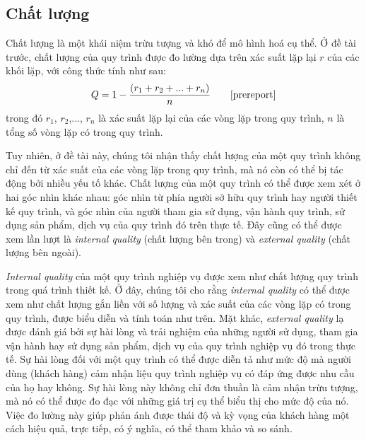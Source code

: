 \subsection{Chất lượng}
Chất lượng là một khái niệm trừu tượng và khó để mô hình hoá cụ thể. Ở đề tài
trước, chất lượng của quy trình được đo lường dựa trên xác suất lặp lại $r$ của
các khối lặp, với công thức tính như sau:
\[ Q = 1 - \frac{(r_1 + r_2 + ... + r_n)}{n} \tag*{\cite{prereport}}\]
trong đó $r_1$, $r_2$,..., $r_n$ là xác suất lặp lại của các vòng lặp trong quy
trình, $n$ là tổng số vòng lặp có trong quy trình.
\par
Tuy nhiên, ở đề tài này, chúng tôi nhận thấy chất lượng của một quy trình không
chỉ đến từ xác suất của các vòng lặp trong quy trình, mà nó còn có thể bị tác
động bởi nhiều yếu tố khác. Chất lượng của một quy trình có thể được xem xét ở
hai góc nhìn khác nhau: góc nhìn từ phía người sở hữu quy trình hay người thiết
kế quy trình, và góc nhìn của người tham gia sử dụng, vận hành quy trình, sử
dụng sản phẩm, dịch vụ của quy trình đó trên thực tế. Đây cũng có thể được xem
lần lượt là \emph{internal quality} (chất lượng bên trong) và \emph{external
    quality} (chất lượng bên ngoài).
\par
\emph{Internal quality} của một quy trình nghiệp vụ được xem như chất lượng quy trình trong quá trình thiết kế. Ở đây, chúng tôi cho rằng \emph{internal quality} có thể được xem như chất lượng gắn liền với số lượng và xác suất của các vòng lặp có trong quy trình, được biểu diễn và tính toán như trên. Mặt khác, \emph{external quality} lạ được đánh giá bởi sự hài lòng và trải nghiệm của những người sử dụng, tham gia vận hành hay sử dụng sản phẩm, dịch vụ của quy trình nghiệp vụ đó trong thực tế. Sự hài lòng đối với một quy trình có thể được diễn tả như mức độ mà người dùng (khách hàng) cảm nhận liệu quy trình nghiệp vụ có đáp ứng được nhu cầu của họ hay không. Sự hài lòng này không chỉ đơn thuần là cảm nhận trừu tượng, mà nó có thể được đo đạc với những giá trị cụ thể biểu thị cho mức độ của nó. Việc đo lường này giúp phản ánh được thái độ và kỳ vọng của khách hàng một cách hiệu quả, trực tiếp, có ý nghĩa, có thể tham khảo và so sánh.
